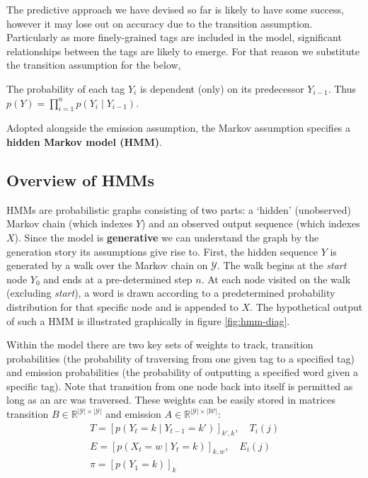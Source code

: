 \documentclass[../main.tex]{subfiles}
\begin{document}
The predictive approach we have devised so far is likely to have some success, however it may lose out on accuracy due to the transition assumption.
Particularly as more finely-grained tags are included in the model, significant relationships between the tags are likely to emerge.
For that reason we substitute the transition assumption for the below,

\begin{assumption} \label{ass:markov-assumption}
    The probability of each tag $Y_i$ is dependent (only) on its predecessor $Y_{i-1}$. Thus $p (Y) = \prod_{i=1}^n p (Y_i \mid Y_{i-1})$.
\end{assumption}

Adopted alongside the emission assumption, the Markov assumption specifies a \textbf{hidden Markov model (HMM)}.

\subsection{Overview of HMMs}

HMMs are probabilistic graphs consisting of two parts: a `hidden' (unobserved) Markov chain (which indexes $Y$) and an observed output sequence (which indexes $X$).
Since the model is \textbf{generative} we can understand the graph by the generation story its assumptions give rise to.
First, the hidden sequence $Y$ is generated by a walk over the Markov chain on $\mathcal{Y}$.
The walk begins at the \textit{start} node $Y_0$ and ends at a pre-determined step $n$.
At each node visited on the walk (excluding \textit{start}), a word is drawn according to a predetermined probability distribution for that specific node and is appended to $X$.
The hypothetical output of such a HMM is illustrated graphically in figure \ref{fig:hmm-diag}.



Within the model there are two key sets of weights to track, transition probabilities (the probability of traversing from one given tag to a specified tag) and emission probabilities (the probability of outputting a specified word given a specific tag).
Note that transition from one node back into itself is permitted as long as an arc was traversed.
These weights can be easily stored in matrices transition $B \in \mathbb{R}^{|\mathcal{Y}| \times |\mathcal{Y}|}$ and emission $A\in \mathbb{R}^{|\mathcal{Y} |\times |\mathcal{W}|}$:
\begin{gather*} \label{eqn:weight-matrix}
    T  = \left[ p(Y_t = k \mid Y_{t-1} = k') \right]_{k',k}, \quad T_i(j) \\
    E = [p(X_t = w \mid Y_t = k)]_{k,w}, \quad E_i(j) \\
    \pi = [p(Y_1 = k)]_{k}
\end{gather*}
\end{document}

